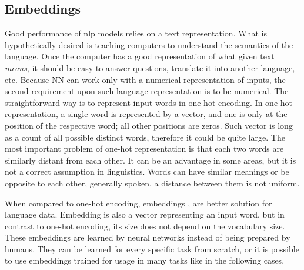 \subsection{Embeddings}
\label{sec:embedd}
Good performance of \acrshort{nlp} models relies on a text representation. What is hypothetically desired is teaching computers to understand the semantics of the language. Once the computer has a good representation of what given text \textit{means}, it should be easy to answer questions, translate it into another language, etc. Because NN can work only with a numerical representation of inputs, the second requirement upon such language representation is to be numerical. The straightforward way is to represent input words in one-hot encoding. In one-hot representation, a single word is represented by a vector, and one is only at the position of the respective word; all other positions are zeros. Such vector is long as a count of all possible distinct words, therefore it could be quite large. The most important problem of one-hot representation is that each two words are similarly distant from each other. It can be an advantage in some areas, but it is not a correct assumption in linguistics. Words can have similar meanings or be opposite to each other, generally spoken, a distance between them is not uniform.
\par
When compared to one-hot encoding, embeddings  \citep{Bengio2003}, \citep{Ling} are better solution for language data. Embedding is also a vector representing an input word, but in contrast to one-hot encoding, its size does not depend on the vocabulary size. These embeddings are learned by neural networks instead of being prepared by humans. They can be learned for every specific task from scratch, or it is possible to use embeddings trained for usage in many tasks like in the following cases.

